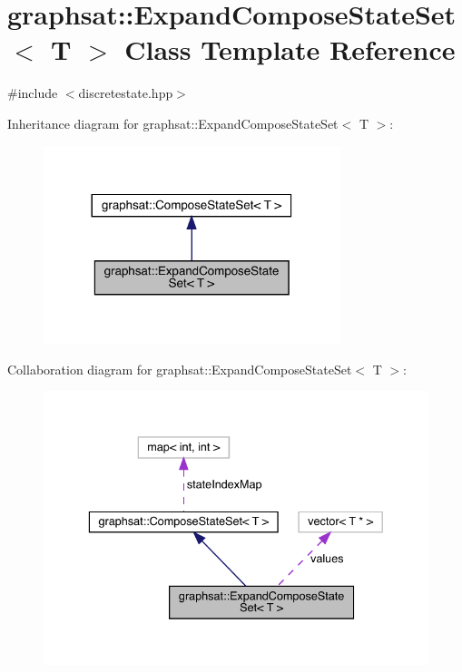 \hypertarget{classgraphsat_1_1_expand_compose_state_set}{}\section{graphsat\+::Expand\+Compose\+State\+Set$<$ T $>$ Class Template Reference}
\label{classgraphsat_1_1_expand_compose_state_set}


{\ttfamily \#include $<$discretestate.\+hpp$>$}



Inheritance diagram for graphsat\+::Expand\+Compose\+State\+Set$<$ T $>$\+:\nopagebreak
\begin{figure}[H]
\begin{center}
\leavevmode
\includegraphics[width=245pt]{classgraphsat_1_1_expand_compose_state_set__inherit__graph}
\end{center}
\end{figure}


Collaboration diagram for graphsat\+::Expand\+Compose\+State\+Set$<$ T $>$\+:\nopagebreak
\begin{figure}[H]
\begin{center}
\leavevmode
\includegraphics[width=336pt]{classgraphsat_1_1_expand_compose_state_set__coll__graph}
\end{center}
\end{figure}
